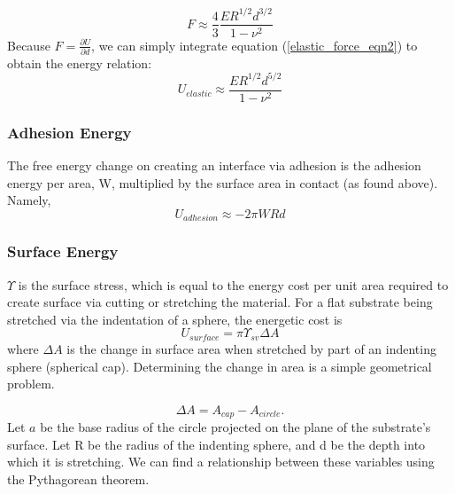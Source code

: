 \begin{equation}
F \approx \frac{4}{3}\frac{ER^{1/2}d^{3/2}}{1-\nu^2}
\label{elastic_force_eqn2}
\end{equation}
Because $F = \frac{\partial U}{\partial d}$, we can simply integrate equation (\ref{elastic_force_eqn2}) to obtain the energy relation:
\begin{equation}
\label{elastic_energy}
U_{elastic} \approx  \frac{ER^{1/2}d^{5/2}}{1-\nu^2}
\end{equation}


\subsubsection{Adhesion Energy}
The free energy change on creating an interface via adhesion is the adhesion energy per area, W, multiplied by the surface area in contact (as found above). Namely,
\begin{equation}
\label{W_energy}
U_{adhesion} \approx -2\pi W R d 
\end{equation}


\subsubsection{Surface Energy}
$\Upsilon$ is the surface stress, which is equal to the energy cost per unit area required to create surface via cutting or stretching the material. For a flat substrate being stretched via the indentation of a sphere, the energetic cost is
\begin{equation}
\label{generic_surface_energy}
U_{surface} = \pi \Upsilon_{sv}\Delta A
\end{equation}
where $\Delta A$ is the change in surface area when stretched by part of an indenting sphere (spherical cap). Determining the change in area is a simple geometrical problem.

\begin{equation}
\Delta A = A_{cap} - A_{circle}. 
\end{equation}
Let $ a $ be the base radius of the circle projected on the plane of the substrate's surface. Let R be the radius of the indenting sphere, and d be the depth into which it is stretching. We can find a relationship between these variables using the Pythagorean theorem.

